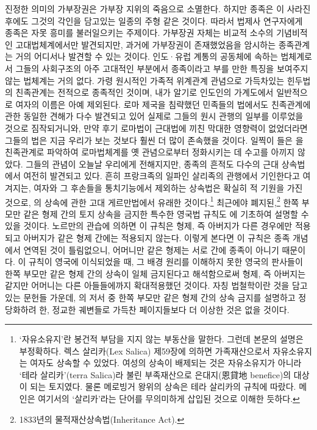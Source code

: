 진정한 의미의 가부장권은 가부장 지위의 죽음으로 소멸한다.
하지만 종족은 이 사라진 후에도 그것의 각인을 담고있는
일종의 주형 같은 것이다.
따라서 법제사 연구자에게 종족은 자못 흥미를 불러일으키는 주제이다.
가부장권 자체는 비교적 소수의 기념비적인 고대법체계에서만 발견되지만,
과거에 가부장권이 존재했었음을 암시하는 종족관계는
거의 어디서나 발견할 수 있는 것이다.
인도^^b7유럽 계통의 공동체에 속하는 법체계로서
그들의 사회구조의 아주 고대적인 부분에서
종족이라고 부를 만한 특징을 보여주지 않는 법체계는 거의 없다.
가령
원시적인 가족적 위계관계 관념으로 가득차있는
힌두법의 친족관계는 전적으로 종족적인 것이며,
내가 알기로 인도인의 가계도에서 일반적으로 여자의 이름은 아예 제외된다.
로마 제국을 침략했던 민족들의 법에서도
친족관계에 관한 동일한 견해가 다수 발견되고 있어
실제로
그들의 원시 관행의 일부를 이루었을 것으로 짐작되거니와,
만약 후기 로마법이 근대법에 끼친 막대한 영향력이 없었더라면
그들의 법은 지금 우리가 보는 것보다 훨씬 더 많이 존속했을 것이다.
일찍이 들은 을  친족관계로 파악하여
로마법체계를 옛 관념으로부터 정화시키는 데 수고를 아끼지 않았다.
그들의 관념이 오늘날 우리에게 전해지지만,
종족의 흔적도 다수의 근대 상속법에서 여전히 발견되고 있다.
흔히 프랑크족의 일파인 살리족의 관행에서
기인한다고 여겨지는,
여자와 그 후손들을 통치기능에서 제외하는 상속법은
확실히 적 기원을 가진 것으로,
의 상속에 관한
고대 게르만법에서 유래한 것이다.\footnote{%
  `자유소유지'란 봉건적 부담을 지지 않는 부동산을 말한다.
  그런데 본문의 설명은 부정확하다.
  렉스 살리카(Lex Salica) 제59장에 의하면
  가족재산으로서 자유소유지는 여자도 상속할 수 있었다.
  여성의 상속이 배제되는 것은 자유소유지가 아니라
  `테라 살리카'(terra Salica)라 불린 부족재산으로
  은대지(恩貸地 benefice)의 대상이 되는 토지였다.
  물론 메로빙거 왕위의 상속은 테라 살리카의 규칙에 따랐다.
  메인은 여기서의 `살리카'라는 단어를 무의미하게 삽입된 것으로 이해한 듯하다.
   }
최근에야 폐지된,\footnote{%
  1833년의 물적재산상속법(Inheritance Act). }
한쪽 부모만 같은 형제 간의 토지 상속을 금지한
특수한 영국법 규칙도 에 기초하여 설명할 수 있을 것이다.
노르만의 관습에 의하면
이 규칙은  형제,
즉 아버지가 다른 경우에만 적용되고
아버지가 같은 형제 간에는 적용되지 않는다.
이렇게 본다면 이 규칙은 종족 개념에서 연역된 것이 틀림없으니,
어머니만 같은 형제는 서로 간에 종족이 아니기 때문이다.
이 규칙이 영국에 이식되었을 때,
그 배경 원리를 이해하지 못한 영국의 판사들이
한쪽 부모만 같은 형제 간의 상속이 일체 금지된다고 해석함으로써
 형제,
즉 아버지는 같지만 어머니는 다른 아들들에까지 확대적용했던 것이다.
자칭 법철학이란 것을 담고 있는 문헌들 가운데,
의 저서 중
한쪽 부모만 같은 형제 간의 상속 금지를 설명하고 정당화하려 한,
정교한 궤변들로 가득찬 페이지들보다 더 이상한 것은 없을 것이다.

